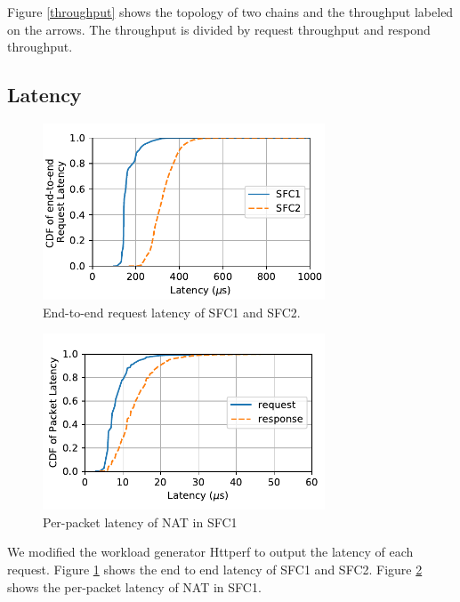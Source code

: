 \documentclass{sig-alternate-10pt}
\begin{document}
Figure \ref{throughput} shows the topology of two chains 
and the throughput labeled on the arrows. 
The throughput is divided by request throughput and respond throughput.

\subsection{Latency}

\begin{figure}[t]
\centering
\includegraphics[width=3.3in]{e2e_latency_chain12.pdf}
\caption{End-to-end request latency of SFC1 and SFC2.}
\label{e2e_latency}
\end{figure}

\begin{figure}[t]
\centering
\includegraphics[width=3.3in]{cdf_chain1.pdf}
\caption{Per-packet latency of NAT in SFC1}
\label{nat_latency}
\end{figure}

We modified the workload generator Httperf to output the latency of each request. 
Figure \ref{e2e_latency} shows the end to end latency of SFC1 and SFC2. 
Figure \ref{nat_latency} shows the per-packet latency of NAT in SFC1. 



\end{document}

